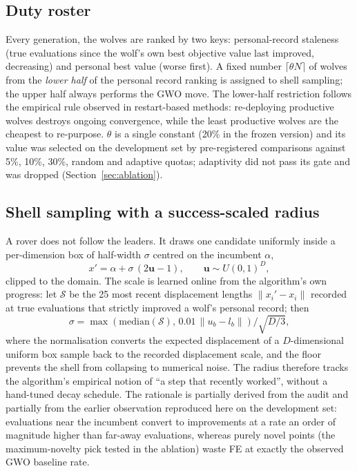 \documentclass[journal]{IEEEtran}
\begin{document}
\subsection{Duty roster}
Every generation, the wolves are ranked by two keys: personal-record
staleness (true evaluations since the wolf's own best objective value last
improved, decreasing) and personal best value (worse first). A fixed number
$\lceil\theta N\rceil$ of wolves from the \emph{lower half} of the personal
record ranking is assigned to shell sampling; the upper half always performs
the GWO move. The lower-half restriction follows the empirical rule observed
in restart-based methods: re-deploying productive wolves destroys ongoing
convergence, while the least productive wolves are the cheapest to
re-purpose. $\theta$ is a single constant (20\% in the frozen version) and
its value was selected on the development set by pre-registered comparisons
against 5\%, 10\%, 30\%, random and adaptive quotas; adaptivity did not pass
its gate and was dropped (Section~\ref{sec:ablation}).

\subsection{Shell sampling with a success-scaled radius}
A rover does not follow the leaders. It draws one candidate uniformly inside
a per-dimension box of half-width $\sigma$ centred on the incumbent
$\alpha$,
\begin{equation}
x' = \alpha + \sigma\,(2\mathbf{u}-1), \qquad
\mathbf{u}\sim U(0,1)^D,
\end{equation}
clipped to the domain. The scale is learned online from the algorithm's own
progress: let $\mathcal{S}$ be the 25 most recent displacement lengths
$\|x_i'-x_i\|$ recorded at true evaluations that strictly improved a wolf's
personal record; then
\begin{equation}
\sigma = \max\!\left(\mathrm{median}(\mathcal{S}),\,0.01\,\|u_b-l_b\|\right)
\Big/\sqrt{D/3},
\end{equation}
where the normalisation converts the expected displacement of a $D$-dimensional
uniform box sample back to the recorded displacement scale, and the floor
prevents the shell from collapsing to numerical noise. The radius therefore
tracks the algorithm's empirical notion of ``a step that recently worked'',
without a hand-tuned decay schedule. The rationale is partially derived from
the audit and partially from the earlier observation reproduced here on the
development set: evaluations near the incumbent convert to improvements at a
rate an order of magnitude higher than far-away evaluations, whereas purely
novel points (the maximum-novelty pick tested in the ablation) waste FE at
exactly the observed GWO baseline rate.
\end{document}
